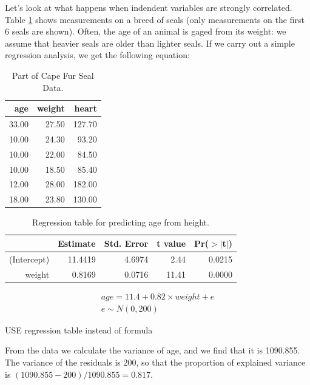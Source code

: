 \documentclass[]{report}\usepackage[]{graphicx}\usepackage[]{color}
\begin{document}
Let's look at what happens when indendent variables are strongly correlated. Table \ref{tab:multi_2} shows measurements on a breed of seals (only measurements on the first 6 seals are shown). Often, the age of an animal is gaged from its weight: we assume that heavier seals are older than lighter seals. If we carry out a simple regression analysis, we get the following equation:


\begin{table}[ht]
\centering
\caption{Part of Cape Fur Seal Data.} 
\label{tab:multi_2}
\begin{tabular}{rrr}
  \hline
age & weight & heart \\ 
  \hline
33.00 & 27.50 & 127.70 \\ 
  10.00 & 24.30 & 93.20 \\ 
  10.00 & 22.00 & 84.50 \\ 
  10.00 & 18.50 & 85.40 \\ 
  12.00 & 28.00 & 182.00 \\ 
  18.00 & 23.80 & 130.00 \\ 
   \hline
\end{tabular}
\end{table}



\begin{table}[ht]
\centering
\caption{Regression table for predicting age from height.} 
\label{tab:multi_2a}
\begin{tabular}{rrrrr}
  \hline
 & Estimate & Std. Error & t value & Pr($>$$|$t$|$) \\ 
  \hline
(Intercept) & 11.4419 & 4.6974 & 2.44 & 0.0215 \\ 
  weight & 0.8169 & 0.0716 & 11.41 & 0.0000 \\ 
   \hline
\end{tabular}
\end{table}



\begin{eqnarray}
age = 11.4 + 0.82 \times  weight + e \\
e \sim N(0, 200)
\end{eqnarray}




USE regression table instead of formula




From the data we calculate the variance of age, and we find that it is 1090.855. The variance of the residuals is 200, so that the proportion of explained variance is $(1090.855-200)/1090.855  = 0.817$.
\end{document}
